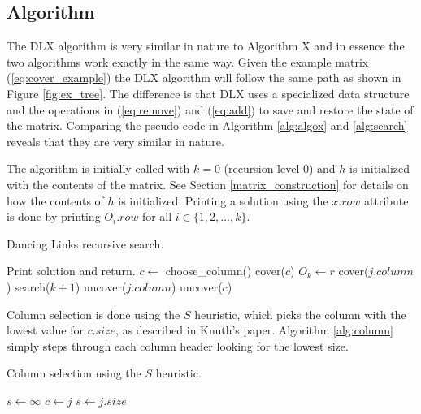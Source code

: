\subsection{Algorithm}

The DLX algorithm is very similar in nature to Algorithm X and in essence the two algorithms work exactly in the same way.
Given the example matrix (\ref{eq:cover_example}) the DLX algorithm will follow the same path as shown in Figure \ref{fig:ex_tree}.
The difference is that DLX uses a specialized data structure and the operations in (\ref{eq:remove}) and (\ref{eq:add}) to save and restore the state of the matrix.
Comparing the pseudo code in Algorithm \ref{alg:algox} and \ref{alg:search} reveals that they are very similar in nature.

The algorithm is initially called with $k = 0$ (recursion level 0) and $h$ is initialized with the contents of the matrix.
See Section \ref{matrix_construction} for details on how the contents of $h$ is initialized.
Printing a solution using the $x.row$ attribute is done by printing $O_{i}.row$ for all $i \in \{1, 2, \ldots, k\}$.
\begin{algorithm}[p]
	\caption{Dancing Links recursive search.}
	\label{alg:search}
	\begin{distribalgo}[1]
				\STATE Print solution and return.  
			\ENDIF
			\STATE $c \leftarrow$ choose\_column()
			\STATE cover($c$)
				\STATE $O_k \leftarrow r$  
					\STATE cover($j.column$)
				\ENDFOR
				\STATE search($k + 1$)
					\STATE uncover($j.column$)
				\ENDFOR
			\ENDFOR
			\STATE uncover($c$)
		\ENDPROC
	\end{distribalgo}
\end{algorithm}

Column selection is done using the $S$ heuristic, which picks the column with the lowest value for $c.size$, as described in Knuth's paper.
Algorithm \ref{alg:column} simply steps through each column header looking for the lowest size.
\begin{algorithm}[p]
	\caption{Column selection using the $S$ heuristic.}
	\label{alg:column}
	\begin{distribalgo}[1]
			\STATE $s \leftarrow \infty$
					\STATE $c \leftarrow j$
					\STATE $s \leftarrow j.size$
				\ENDIF
			\ENDFOR
		\ENDFUNC
	\end{distribalgo}
\end{algorithm}

